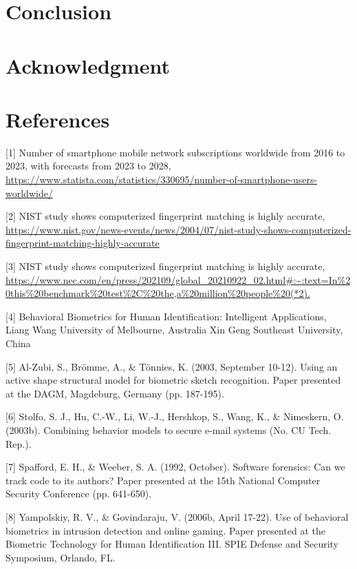 \documentclass{article}
\begin{document}
\clearpage
\newpage
\section{Conclusion}
\noindent
\section{Acknowledgment}


\newpage
\section{References}
\begin{raggedright}

[1] Number of smartphone mobile network subscriptions worldwide from 2016 to 2023, with forecasts from 2023 to 2028, \url{https://www.statista.com/statistics/330695/number-of-smartphone-users-worldwide/}

[2] NIST study shows computerized fingerprint matching is highly accurate, \url{https://www.nist.gov/news-events/news/2004/07/nist-study-shows-computerized-fingerprint-matching-highly-accurate}

[3] NIST study shows computerized fingerprint matching is highly accurate, \url{https://www.nec.com/en/press/202109/global_20210922_02.html#:~:text=In%20this%20benchmark%20test%2C%20the,a%20million%20people%20(*2).}

[4] Behavioral Biometrics for Human Identification: Intelligent Applications, Liang Wang University of Melbourne, Australia Xin Geng Southeast University, China

[5] Al-Zubi, S., Brömme, A., \& Tönnies, K. (2003, September 10-12). Using an active shape structural model for biometric sketch recognition. Paper presented at the DAGM, Magdeburg, Germany (pp. 187-195).

[6] Stolfo, S. J., Hu, C.-W., Li, W.-J., Hershkop, S., Wang, K., \& Nimeskern, O. (2003b). Combining behavior models to secure e-mail systems (No. CU Tech. Rep.). 

[7] Spafford, E. H., \& Weeber, S. A. (1992, October). Software forensics: Can we track code to its authors? Paper presented at the 15th National Computer Security Conference (pp. 641-650).

[8] Yampolskiy, R. V., \& Govindaraju, V. (2006b, April 17-22). Use of behavioral biometrics in intrusion detection and online gaming. Paper presented at the Biometric Technology for Human Identification III. SPIE Defense and Security Symposium, Orlando, FL.


\end{raggedright}
\end{document}

